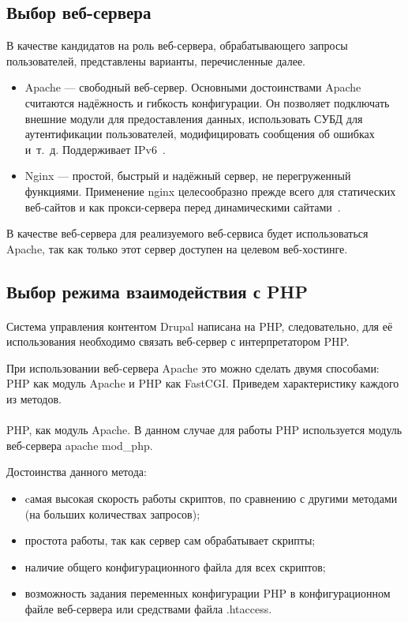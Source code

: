 \subsection{Выбор веб-сервера}
\label{ssec:choice_web-server}

В качестве кандидатов на роль веб-сервера, обрабатывающего запросы пользователей,
представлены варианты, перечисленные далее.

\begin{itemize}
  \item Apache --- свободный веб-сервер. Основными достоинствами Apache считаются надёжность и гибкость конфигурации.
    Он позволяет подключать внешние модули для предоставления данных, использовать 
    СУБД для аутентификации пользователей, модифицировать сообщения об ошибках и~т.~д. Поддерживает IPv6~\cite{wiki_apache}.

  \item Nginx --- простой, быстрый и надёжный сервер, не перегруженный функциями.
    Применение nginx целесообразно прежде всего для статических веб-сайтов
    и как прокси-сервера перед динамическими сайтами~\cite{wiki_nginx}.
\end{itemize}

В качестве веб-сервера для реализуемого веб-сервиса
будет использоваться Apache, так как только этот сервер доступен
на целевом веб-хостинге.

\subsection{Выбор режима взаимодействия с PHP}
\label{ssec:choice_php_communication}

\paragraph{}
Система управления контентом Drupal написана на PHP, следовательно, для её использования необходимо связать
веб-сервер с интерпретатором PHP.

При использовании веб-сервера Apache это можно сделать двумя способами: PHP как модуль Apache и PHP как FastCGI.
Приведем характеристику каждого из методов.

\paragraph{}
PHP, как модуль Apache. В данном случае для работы PHP используется модуль веб-сервера apache mod\_php.

Достоинства данного метода:
\begin{itemize}
\item
  cамая высокая скорость работы скриптов, по сравнению с другими методами (на больших количествах запросов);
\item
  простота работы, так как сервер сам обрабатывает скрипты;
\item
  наличие общего конфигурационного файла для всех скриптов;
\item
  возможность задания переменных конфигурации PHP в конфигурационном файле веб-сервера или средствами файла .htaccess.
\end{itemize}

